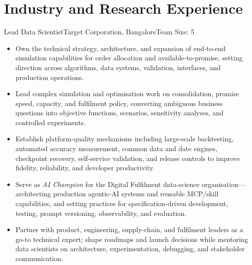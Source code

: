 \documentclass[11pt,a4paper]{moderncv}
\begin{document}
  \par\medskip
\endgroup

\hypertarget{industry-and-research-experience}{
\section{Industry and Research
Experience}\label{industry-and-research-experience}}

\nopagebreak
    {Lead Data Scientist}{Target Corporation, Bangalore}{}{Team Size: 5}{
    \begin{itemize}
        \item Own the technical strategy, architecture, and expansion of end-to-end simulation capabilities for order allocation and available-to-promise, setting direction across algorithms, data systems, validation, interfaces, and production operations.
        \item Lead complex simulation and optimisation work on consolidation, promise speed, capacity, and fulfilment policy, converting ambiguous business questions into objective functions, scenarios, sensitivity analyses, and controlled experiments.
        \item Establish platform-quality mechanisms including large-scale backtesting, automated accuracy measurement, common data and date engines, checkpoint recovery, self-service validation, and release controls to improve fidelity, reliability, and developer productivity.
        \item Serve as \textit{AI Champion} for the Digital Fulfilment data-science organisation---architecting production agentic-AI systems and reusable MCP/skill capabilities, and setting practices for specification-driven development, testing, prompt versioning, observability, and evaluation.
        \item Partner with product, engineering, supply-chain, and fulfilment leaders as a go-to technical expert; shape roadmaps and launch decisions while mentoring data scientists on architecture, experimentation, debugging, and stakeholder communication.
    \end{itemize}
    }
\end{document}
